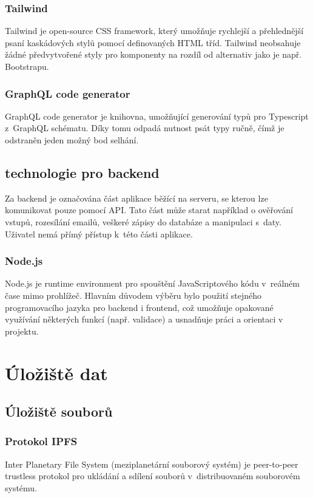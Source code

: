\documentclass[12pt, a4paper,
  oneside,      %
]{report}
\begin{document}
    \subsection{Tailwind}
    Tailwind je open-source CSS framework, který umožňuje rychlejší a přehlednější psaní kaskádových stylů pomocí definovaných HTML tříd. Tailwind neobsahuje žádné předvytvořené styly pro komponenty na rozdíl od alternativ jako je např. Bootstrapu. \cite{bootstrap}\cite{tailwindDocumentation}
    
    \subsection{GraphQL code generator}
    GraphQL code generator je knihovna, umožňující generování typů pro Typescript z~GraphQL schématu. Díky tomu odpadá nutnost psát typy ručně, čímž je odstraněn jeden možný bod selhání. \cite{graphqlCodeGeneratorDocs}

\section{technologie pro backend}
Za backend je označována část aplikace běžící na serveru, se kterou lze komunikovat pouze pomocí API. Tato část může starat například o ověřování vstupů, rozesílání emailů, veškeré zápisy do databáze a manipulaci s~daty. Uživatel nemá přímý přístup k~této části aplikace. \cite{whatIsFrontend} %

    \subsection{Node.js}
    Node.js je runtime environment pro spouštění JavaScriptového kódu v~reálném čase mimo prohlížeč. Hlavním důvodem výběru bylo použití stejného programovacího jazyka pro backend i frontend, což umožňuje opakované využívání některých funkcí (např. validace) a usnadňuje práci a orientaci v projektu. \cite{aboutNodeJS}

\chapter{Úložiště dat}
\section{Úložiště souborů}
\subsection{Protokol IPFS}\label{subsection:IPFS}
Inter Planetary File System (meziplanetární souborový systém) je peer-to-peer trustless protokol pro ukládání a sdílení souborů v~distribuovaném souborovém systému. \cite{IPFSDocs}
\end{document}
